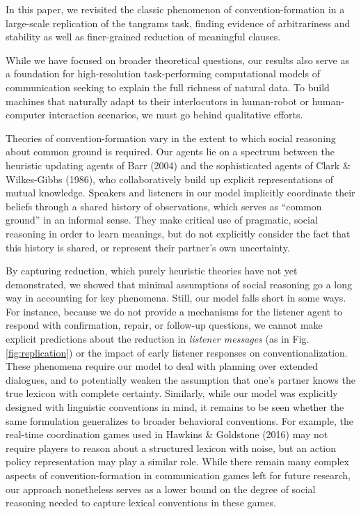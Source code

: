 In this paper, we revisited the classic phenomenon of
convention-formation in a large-scale replication of the tangrams task,
finding evidence of arbitrariness and stability as well as finer-grained
reduction of meaningful clauses. 

While we have focused on broader theoretical questions, our results also serve as a foundation for high-resolution task-performing computational models of communication seeking to explain the full richness of natural data. To build machines that naturally adapt to their interlocutors in human-robot or human-computer interaction scenarios, we must go behind qualitative efforts.

Theories of convention-formation vary in the extent to which social
reasoning about common ground is required. Our agents lie on a spectrum
between the heuristic updating agents of Barr (2004) and the
sophisticated agents of Clark \& Wilkes-Gibbs (1986), who
collaboratively build up explicit representations of mutual knowledge.
Speakers and listeners in our model implicitly coordinate their beliefs
through a shared history of observations, which serves as ``common
ground'' in an informal sense. They make critical use of pragmatic,
social reasoning in order to learn meanings, but do not explicitly
consider the fact that this history is shared, or represent their
partner's own uncertainty.

By capturing reduction, which purely heuristic theories have not yet
demonstrated, we showed that minimal assumptions of social reasoning go
a long way in accounting for key phenomena. Still, our model falls short
in some ways. For instance, because we do not provide a mechanisms for
the listener agent to respond with confirmation, repair, or follow-up
questions, we cannot make explicit predictions about the reduction in
\emph{listener messages} (as in Fig. \ref{fig:replication}) or the
impact of early listener responses on conventionalization. These
phenomena require our model to deal with planning over extended
dialogues, and to potentially weaken the assumption that one's partner
knows the true lexicon with complete certainty. Similarly, while our
model was explicitly designed with linguistic conventions in mind, it
remains to be seen whether the same formulation generalizes to broader
behavioral conventions. For example, the real-time coordination games
used in Hawkins \& Goldstone (2016) may not require players to reason
about a structured lexicon with noise, but an action policy
representation may play a similar role. While there remain many complex
aspects of convention-formation in communication games left for future
research, our approach nonetheless serves as a lower bound on the degree
of social reasoning needed to capture lexical conventions in these
games.